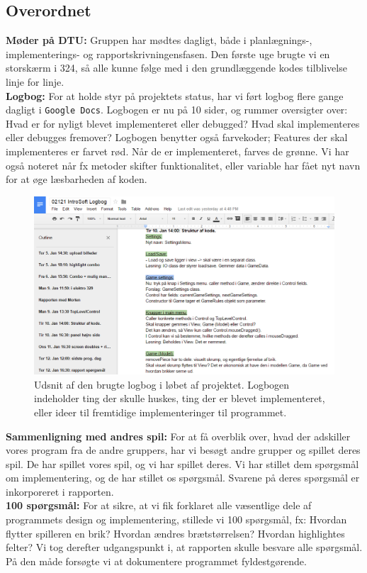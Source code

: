 \subsection{Overordnet}\label{sec:evaOverordnet}

\textbf{Møder på DTU:} Gruppen har mødtes dagligt, både i planlægnings-, implementerings- og rapportskrivningensfasen. Den første uge brugte vi en storskærm i 324, så alle kunne følge med i den grundlæggende kodes tilblivelse linje for linje. \\

\textbf{Logbog:} For at holde styr på projektets status, har vi ført logbog flere gange dagligt i \texttt{Google Docs}. Logbogen er nu på 10 sider, og rummer oversigter over: Hvad er for nyligt blevet implementeret eller debugged? Hvad skal implementeres eller debugges fremover? Logbogen benytter også farvekoder; Features der skal implementeres er farvet rød. Når de er implementeret, farves de grønne. Vi har også noteret når fx metoder skifter funktionalitet, eller variable har fået nyt navn for at øge læsbarheden af koden.\\

\begin{figure}[H]
\centering
\includegraphics[width = 0.7  \textwidth]{Figurer/logbog.png}
\caption{Udsnit af den brugte logbog i løbet af projektet. Logbogen indeholder ting der skulle huskes, ting der er blevet implementeret, eller ideer til fremtidige implementeringer til programmet.}
\label{fig:logbog}
\end{figure}

\textbf{Sammenligning med andres spil:} For at få overblik over, hvad der adskiller vores program fra de andre gruppers, har vi besøgt andre grupper og spillet deres spil. De har spillet vores spil, og vi har spillet deres. Vi har stillet dem spørgsmål om implementering, og de har stillet os spørgsmål. Svarene på deres spørgsmål er inkorporeret i rapporten. \\

\textbf{100 spørgsmål:} For at sikre, at vi fik forklaret alle væsentlige dele af programmets design og implementering, stillede vi 100 spørgsmål, fx: Hvordan flytter spilleren en brik? Hvordan ændres brætstørrelsen? Hvordan highlightes felter?
Vi tog derefter udgangspunkt i, at rapporten skulle besvare alle spørgsmål. På den måde forsøgte vi at dokumentere programmet fyldestgørende. 